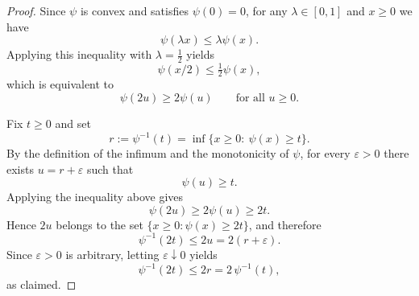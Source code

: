 \documentclass[12pt]{article}
\renewcommand{\(}{\left(}%
\renewcommand{\)}{\right)}%
\renewcommand{\[}{\left[}%
\renewcommand{\]}{\right]}%
\newtheorem{proof}{Proof.}}
\begin{document}
\begin{proof}
Since $\psi$ is convex and satisfies $\psi(0)=0$, for any $\lambda\in[0,1]$
and $x\ge 0$ we have
\begin{equation*}
\psi(\lambda x)
\le \lambda \psi(x).
\end{equation*}
Applying this inequality with $\lambda=\tfrac12$ yields
\begin{equation*}
\psi(x/2)\le \tfrac12 \psi(x),
\end{equation*}
which is equivalent to
\begin{equation*}
\psi(2u)\ge 2\psi(u)
\qquad\text{for all }u\ge 0.
\end{equation*}

Fix $t\ge 0$ and set
\begin{equation*}
r:=\psi^{-1}(t)
=\inf\{x\ge 0:\ \psi(x)\ge t\}.
\end{equation*}
By the definition of the infimum and the monotonicity of $\psi$,  for every $\varepsilon>0$ there exists
$u=r+\varepsilon$ such that
\begin{equation*}
\psi(u)\ge t.
\end{equation*}
Applying the inequality above gives
\begin{equation*}
\psi(2u)\ge 2\psi(u)\ge 2t.
\end{equation*}
Hence $2u$ belongs to the set $\{x\ge 0:\psi(x)\ge 2t\}$, and therefore
\begin{equation*}
\psi^{-1}(2t)
\le 2u
=2(r+\varepsilon).
\end{equation*}
Since $\varepsilon>0$ is arbitrary, letting $\varepsilon\downarrow 0$ yields
\begin{equation*}
\psi^{-1}(2t)\le 2r=2\,\psi^{-1}(t),
\end{equation*}
as claimed.
\end{proof}
\end{document}
